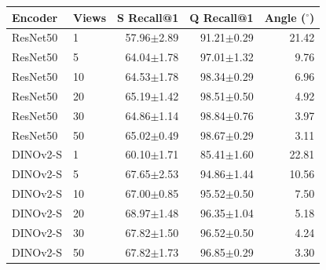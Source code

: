 \begin{tabular}{llrrr}
\toprule
Encoder & Views & S Recall@1 & Q Recall@1 & Angle ($^\circ$) \\
\midrule
ResNet50 & 1 & 57.96$\pm$2.89 & 91.21$\pm$0.29 & 21.42 \\
ResNet50 & 5 & 64.04$\pm$1.78 & 97.01$\pm$1.32 & 9.76 \\
ResNet50 & 10 & 64.53$\pm$1.78 & 98.34$\pm$0.29 & 6.96 \\
ResNet50 & 20 & 65.19$\pm$1.42 & 98.51$\pm$0.50 & 4.92 \\
ResNet50 & 30 & 64.86$\pm$1.14 & 98.84$\pm$0.76 & 3.97 \\
ResNet50 & 50 & 65.02$\pm$0.49 & 98.67$\pm$0.29 & 3.11 \\
DINOv2-S & 1 & 60.10$\pm$1.71 & 85.41$\pm$1.60 & 22.81 \\
DINOv2-S & 5 & 67.65$\pm$2.53 & 94.86$\pm$1.44 & 10.56 \\
DINOv2-S & 10 & 67.00$\pm$0.85 & 95.52$\pm$0.50 & 7.50 \\
DINOv2-S & 20 & 68.97$\pm$1.48 & 96.35$\pm$1.04 & 5.18 \\
DINOv2-S & 30 & 67.82$\pm$1.50 & 96.52$\pm$0.50 & 4.24 \\
DINOv2-S & 50 & 67.82$\pm$1.73 & 96.85$\pm$0.29 & 3.30 \\
\bottomrule
\end{tabular}
